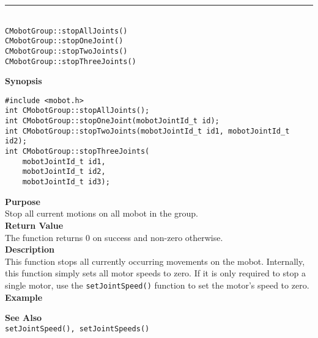 \noindent
\vspace{5pt}
\rule{4.5in}{0.015in}\\
\noindent
{\LARGE \texttt{CMobotGroup::stopAllJoints()}}\\
{\LARGE \texttt{CMobotGroup::stopOneJoint()}}\\
{\LARGE \texttt{CMobotGroup::stopTwoJoints()}}\\
{\LARGE \texttt{CMobotGroup::stopThreeJoints()}}\\
{}

\noindent
{\bf Synopsis}
\vspace{-8pt}
\begin{verbatim}
#include <mobot.h>
int CMobotGroup::stopAllJoints();
int CMobotGroup::stopOneJoint(mobotJointId_t id);
int CMobotGroup::stopTwoJoints(mobotJointId_t id1, mobotJointId_t id2);
int CMobotGroup::stopThreeJoints(
    mobotJointId_t id1,
    mobotJointId_t id2,
    mobotJointId_t id3);
\end{verbatim}

\noindent
{\bf Purpose}\\
Stop all current motions on all mobot in the group.\\

\noindent
{\bf Return Value}\\
The function returns 0 on success and non-zero otherwise.\\

\noindent
{\bf Description}\\
This function stops all currently occurring movements on the mobot. Internally, this function simply sets all motor speeds to zero. If it is only required to stop a single motor, use the 
\texttt{setJointSpeed()} function to set the motor's speed to zero. \\

\noindent
{\bf Example}\\
\noindent

\noindent
{\bf See Also}\\
\texttt{setJointSpeed(), setJointSpeeds()}

